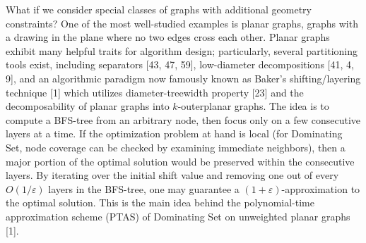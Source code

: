 What if we consider special classes of graphs with additional geometry constraints? One of the most well-studied examples is planar graphs, graphs with a drawing in the plane where no two edges cross each other. Planar graphs exhibit many helpful traits for algorithm design; particularly, several partitioning tools exist, including separators [43, 47, 59], low-diameter decompositions [41, 4, 9], and an algorithmic paradigm now famously known as Baker’s shifting/layering technique [1] which utilizes diameter-treewidth property [23] and the decomposability of planar graphs into $k$-outerplanar graphs. The idea is to compute a BFS-tree from an arbitrary node, then focus only on a few consecutive layers at a time. If the optimization problem at hand is local (for Dominating Set, node coverage can be checked by examining immediate neighbors), then a major portion of the optimal solution would be preserved within the consecutive layers. By iterating over the initial shift value and removing one out of every $O(1/\varepsilon)$ layers in the BFS-tree, one may guarantee a $(1+\varepsilon)$-approximation to the optimal solution. This is the main idea behind the polynomial-time approximation scheme (PTAS) of Dominating Set on unweighted planar graphs [1].
\par
\par
